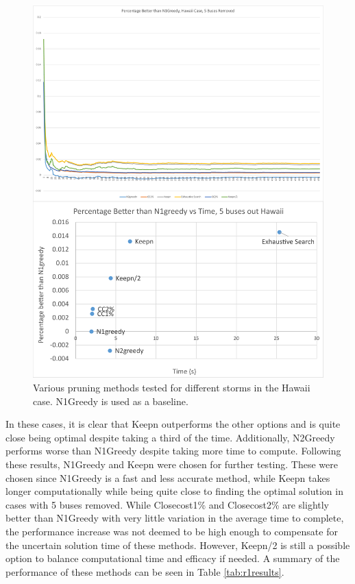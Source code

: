 \documentclass[12pt]{article}
\begin{document}
\begin{figure}[ht]
    \centering %
    \includegraphics[scale = 0.24]{Hawaii5busr1.pdf}
    \caption[Initial Testing - 5 buses removed, Texas Case]{Various pruning methods tested for different storms in the Hawaii case. N1Greedy is used as a baseline.}
    \label{fig:Hawaii5busr1}
\end{figure}
In these cases, it is clear that Keepn outperforms the other options and is quite close being optimal despite taking a third of the time. Additionally, N2Greedy performs worse than N1Greedy despite taking more time to compute. Following these results, N1Greedy and Keepn were chosen for further testing. These were chosen since N1Greedy is a fast and less accurate method, while Keepn takes longer computationally while being quite close to finding the optimal solution in cases with 5 buses removed. While Closecost1\% and Closecost2\% are slightly better than N1Greedy with very little variation in the average time to complete, the performance increase was not deemed to be high enough to compensate for the uncertain solution time of these methods. However, Keepn/2 is still a possible option to balance computational time and efficacy if needed. A summary of the performance of these methods can be seen in Table \ref{tab:r1results}. \par
\end{document}
